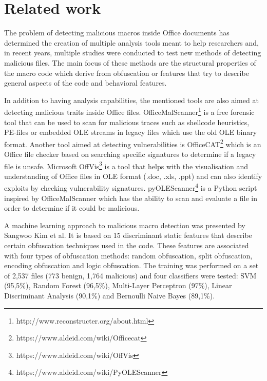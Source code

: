 \section{Related work}
The problem of detecting malicious macros inside Office documents has determined the creation of multiple analysis tools meant to help researchers and, in recent years, multiple studies were conducted to test new methods of detecting malicious files. The main focus of these methods are the structural properties of the macro code which derive from obfuscation or features that try to describe general aspects of the code and behavioral features. 
\par
In addition to having analysis capabilities, the mentioned tools are also aimed at detecting malicious traits inside Office files. OfficeMalScanner\footnote{http://www.reconstructer.org/about.html} is a free forensic tool that can be used to scan for malicious traces such as shellcode heuristics, PE-files or embedded OLE streams in legacy files which use the old OLE binary format. Another tool aimed at detecting vulnerabilities is OfficeCAT\footnote{https://www.aldeid.com/wiki/Officecat} which is an Office file checker based on searching specific signatures to determine if a legacy file is unsafe. Microsoft OffVis\footnote{https://www.aldeid.com/wiki/OffVis} is a tool that helps with the visualisation and understanding of Office files in OLE format (.doc, .xls, .ppt) and can also identify exploits by checking vulnerability signatures. pyOLEScanner\footnote{https://www.aldeid.com/wiki/PyOLEScanner} is a Python script inspired by OfficeMalScanner which has the ability to scan and evaluate a file in order to determine if it could be malicious.
\par
A machine learning approach to malicious macro detection was presented by Sangwoo Kim et al. \cite{KimHOL18} It is based on 15 discriminant static features that describe certain obfuscation techniques used in the code. These features are associated with four types of obfuscation methods: random obfuscation, split obfuscation, encoding obfuscation and logic obfuscation. The training was performed on a set of 2,537 files (773 benign, 1,764 malicious) and four classifiers were tested: SVM (95,5\%), Random Forest (96,5\%), Multi-Layer Perceptron (97\%), Linear Discriminant Analysis (90,1\%) and Bernoulli Naive Bayes (89,1\%). 
\par
